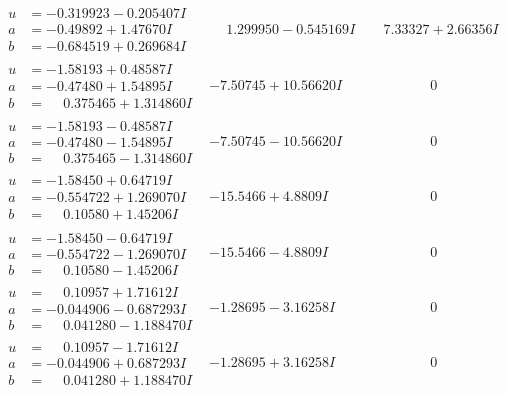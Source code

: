 \documentclass[1p]{elsarticle_modified}
\theoremstyle{definition}
\begin{document}
$$\begin{array}{c|c|c}
\begin{aligned}
u &= -0.319923 - 0.205407 I \\
a &= -0.49892 + 1.47670 I \\
b &= -0.684519 + 0.269684 I\end{aligned}
 & \phantom{-}1.299950 - 0.545169 I & \phantom{-}7.33327 + 2.66356 I \\ \hline\begin{aligned}
u &= -1.58193 + 0.48587 I \\
a &= -0.47480 + 1.54895 I \\
b &= \phantom{-}0.375465 + 1.314860 I\end{aligned}
 & -7.50745 + 10.56620 I & \phantom{-0.000000 } 0 \\ \hline\begin{aligned}
u &= -1.58193 - 0.48587 I \\
a &= -0.47480 - 1.54895 I \\
b &= \phantom{-}0.375465 - 1.314860 I\end{aligned}
 & -7.50745 - 10.56620 I & \phantom{-0.000000 } 0 \\ \hline\begin{aligned}
u &= -1.58450 + 0.64719 I \\
a &= -0.554722 + 1.269070 I \\
b &= \phantom{-}0.10580 + 1.45206 I\end{aligned}
 & -15.5466 + 4.8809 I & \phantom{-0.000000 } 0 \\ \hline\begin{aligned}
u &= -1.58450 - 0.64719 I \\
a &= -0.554722 - 1.269070 I \\
b &= \phantom{-}0.10580 - 1.45206 I\end{aligned}
 & -15.5466 - 4.8809 I & \phantom{-0.000000 } 0 \\ \hline\begin{aligned}
u &= \phantom{-}0.10957 + 1.71612 I \\
a &= -0.044906 - 0.687293 I \\
b &= \phantom{-}0.041280 - 1.188470 I\end{aligned}
 & -1.28695 - 3.16258 I & \phantom{-0.000000 } 0 \\ \hline\begin{aligned}
u &= \phantom{-}0.10957 - 1.71612 I \\
a &= -0.044906 + 0.687293 I \\
b &= \phantom{-}0.041280 + 1.188470 I\end{aligned}
 & -1.28695 + 3.16258 I & \phantom{-0.000000 } 0 \\ \hline\begin{aligned}

\end{aligned}
\end{array}$$
\end{document}

